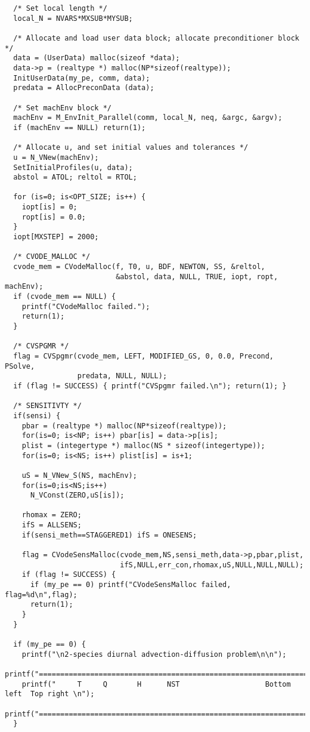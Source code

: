 \begin{verbatim}
  /* Set local length */
  local_N = NVARS*MXSUB*MYSUB;

  /* Allocate and load user data block; allocate preconditioner block */
  data = (UserData) malloc(sizeof *data);
  data->p = (realtype *) malloc(NP*sizeof(realtype));
  InitUserData(my_pe, comm, data);
  predata = AllocPreconData (data);

  /* Set machEnv block */
  machEnv = M_EnvInit_Parallel(comm, local_N, neq, &argc, &argv);
  if (machEnv == NULL) return(1);

  /* Allocate u, and set initial values and tolerances */ 
  u = N_VNew(machEnv);
  SetInitialProfiles(u, data);
  abstol = ATOL; reltol = RTOL;

  for (is=0; is<OPT_SIZE; is++) {
    iopt[is] = 0;
    ropt[is] = 0.0;
  }
  iopt[MXSTEP] = 2000;

  /* CVODE_MALLOC */
  cvode_mem = CVodeMalloc(f, T0, u, BDF, NEWTON, SS, &reltol,
                          &abstol, data, NULL, TRUE, iopt, ropt, machEnv);
  if (cvode_mem == NULL) {
    printf("CVodeMalloc failed.");
    return(1);
  }

  /* CVSPGMR */
  flag = CVSpgmr(cvode_mem, LEFT, MODIFIED_GS, 0, 0.0, Precond, PSolve, 
                 predata, NULL, NULL);
  if (flag != SUCCESS) { printf("CVSpgmr failed.\n"); return(1); }

  /* SENSITIVTY */
  if(sensi) {
    pbar = (realtype *) malloc(NP*sizeof(realtype));
    for(is=0; is<NP; is++) pbar[is] = data->p[is];
    plist = (integertype *) malloc(NS * sizeof(integertype));
    for(is=0; is<NS; is++) plist[is] = is+1;

    uS = N_VNew_S(NS, machEnv);
    for(is=0;is<NS;is++)
      N_VConst(ZERO,uS[is]);

    rhomax = ZERO;
    ifS = ALLSENS;
    if(sensi_meth==STAGGERED1) ifS = ONESENS;

    flag = CVodeSensMalloc(cvode_mem,NS,sensi_meth,data->p,pbar,plist,
                           ifS,NULL,err_con,rhomax,uS,NULL,NULL,NULL);
    if (flag != SUCCESS) {
      if (my_pe == 0) printf("CVodeSensMalloc failed, flag=%d\n",flag);
      return(1);
    }
  }

  if (my_pe == 0) {
    printf("\n2-species diurnal advection-diffusion problem\n\n");
    printf("========================================================================\n");
    printf("     T     Q       H      NST                    Bottom left  Top right \n");
    printf("========================================================================\n");
  }


\end{verbatim}
